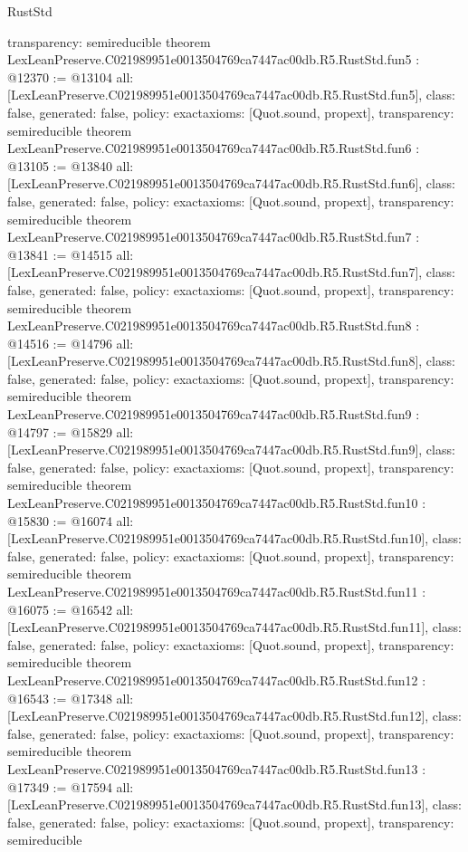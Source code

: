 \begin{lexlean}{RustStd}
\begin{coremodule}
{  transparency: semireducible
}
theorem LexLeanPreserve.C021989951e0013504769ca7447ac00db.R5.RustStd.fun5 : @12370 := @13104 {
  all: [LexLeanPreserve.C021989951e0013504769ca7447ac00db.R5.RustStd.fun5],
  class: false,
  generated: false,
  policy: exact{axioms: [Quot.sound, propext]},
  transparency: semireducible
}
theorem LexLeanPreserve.C021989951e0013504769ca7447ac00db.R5.RustStd.fun6 : @13105 := @13840 {
  all: [LexLeanPreserve.C021989951e0013504769ca7447ac00db.R5.RustStd.fun6],
  class: false,
  generated: false,
  policy: exact{axioms: [Quot.sound, propext]},
  transparency: semireducible
}
theorem LexLeanPreserve.C021989951e0013504769ca7447ac00db.R5.RustStd.fun7 : @13841 := @14515 {
  all: [LexLeanPreserve.C021989951e0013504769ca7447ac00db.R5.RustStd.fun7],
  class: false,
  generated: false,
  policy: exact{axioms: [Quot.sound, propext]},
  transparency: semireducible
}
theorem LexLeanPreserve.C021989951e0013504769ca7447ac00db.R5.RustStd.fun8 : @14516 := @14796 {
  all: [LexLeanPreserve.C021989951e0013504769ca7447ac00db.R5.RustStd.fun8],
  class: false,
  generated: false,
  policy: exact{axioms: [Quot.sound, propext]},
  transparency: semireducible
}
theorem LexLeanPreserve.C021989951e0013504769ca7447ac00db.R5.RustStd.fun9 : @14797 := @15829 {
  all: [LexLeanPreserve.C021989951e0013504769ca7447ac00db.R5.RustStd.fun9],
  class: false,
  generated: false,
  policy: exact{axioms: [Quot.sound, propext]},
  transparency: semireducible
}
theorem LexLeanPreserve.C021989951e0013504769ca7447ac00db.R5.RustStd.fun10 : @15830 := @16074 {
  all: [LexLeanPreserve.C021989951e0013504769ca7447ac00db.R5.RustStd.fun10],
  class: false,
  generated: false,
  policy: exact{axioms: [Quot.sound, propext]},
  transparency: semireducible
}
theorem LexLeanPreserve.C021989951e0013504769ca7447ac00db.R5.RustStd.fun11 : @16075 := @16542 {
  all: [LexLeanPreserve.C021989951e0013504769ca7447ac00db.R5.RustStd.fun11],
  class: false,
  generated: false,
  policy: exact{axioms: [Quot.sound, propext]},
  transparency: semireducible
}
theorem LexLeanPreserve.C021989951e0013504769ca7447ac00db.R5.RustStd.fun12 : @16543 := @17348 {
  all: [LexLeanPreserve.C021989951e0013504769ca7447ac00db.R5.RustStd.fun12],
  class: false,
  generated: false,
  policy: exact{axioms: [Quot.sound, propext]},
  transparency: semireducible
}
theorem LexLeanPreserve.C021989951e0013504769ca7447ac00db.R5.RustStd.fun13 : @17349 := @17594 {
  all: [LexLeanPreserve.C021989951e0013504769ca7447ac00db.R5.RustStd.fun13],
  class: false,
  generated: false,
  policy: exact{axioms: [Quot.sound, propext]},
  transparency: semireducible
}
\end{coremodule}
\end{lexlean}
